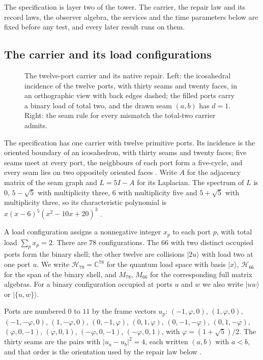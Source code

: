 \documentclass[11pt]{article}
\theoremstyle{definition}
\theoremstyle{remark}
\theoremstyle{plain}
\newcommand{\ket}[1]{\lvert #1\rangle}
\newcommand{\C}{\mathbb{C}}
\newcommand{\Hil}{\mathcal{H}}
\begin{document}
The specification is layer two of the tower. The carrier, the repair law and
its record laws, the observer algebra, the services and the time parameters
below are fixed before any test, and every later result runs on them.

\subsection{The carrier and its load configurations}
\label{sec:carrier}

\begin{figure}[!htb]
\centering

\caption{The twelve-port carrier and its native repair. Left: the icosahedral incidence of the twelve ports, with thirty seams and twenty faces, in an orthographic view with back edges dashed; the filled ports carry a binary load of total two, and the drawn seam $(a,b)$ has $d=1$. Right: the seam rule for every mismatch the total-two carrier admits.}
\label{fig:carrier}
\end{figure}

The specification has one carrier with twelve primitive ports. Its incidence
is the oriented boundary of an icosahedron, with thirty seams and twenty
faces; five seams meet at every port, the neighbours of each port form a
five-cycle, and every seam lies on two oppositely oriented faces
\cite{ophmicro,flagship}. Write $A$ for the adjacency matrix of the seam
graph and $L=5I-A$ for its Laplacian. The spectrum of $L$ is $0$,
$5-\sqrt5$ with multiplicity three, $6$ with multiplicity five and
$5+\sqrt5$ with multiplicity three, so its characteristic polynomial is
$x(x-6)^5(x^2-10x+20)^3$ \cite{oQM,rQM,csSLOW}.

A load configuration assigns a nonnegative integer $x_p$ to each port $p$,
with total load $\sum_p x_p=2$. There are 78 configurations. The 66 with two
distinct occupied ports form the binary shell; the other twelve are
collisions $\ket{2u}$ with load two at one port $u$. We write $\Hil_{78}=\C^{78}$
for the quantum load space with basis $\ket{x}$, $\Hil_{66}$ for the span of
the binary shell, and $M_{78}$, $M_{66}$ for the corresponding full matrix
algebras. For a binary configuration occupied at ports $u$ and $w$ we also write $\ket{uw}$ or $\ket{\{u,w\}}$.

Ports are numbered $0$ to $11$ by the frame vectors $u_p$: $(-1,\varphi,0)$, $(1,\varphi,0)$, $(-1,-\varphi,0)$, $(1,-\varphi,0)$, $(0,-1,\varphi)$, $(0,1,\varphi)$, $(0,-1,-\varphi)$, $(0,1,-\varphi)$, $(\varphi,0,-1)$, $(\varphi,0,1)$, $(-\varphi,0,-1)$, $(-\varphi,0,1)$, with $\varphi=(1+\sqrt5)/2$. The thirty seams are the pairs with $\lvert u_a-u_b\rvert^2=4$, each written $(a,b)$ with $a<b$, and that order is the orientation used by the repair law below \cite{csSLOW,csCAUS}.
\end{document}
